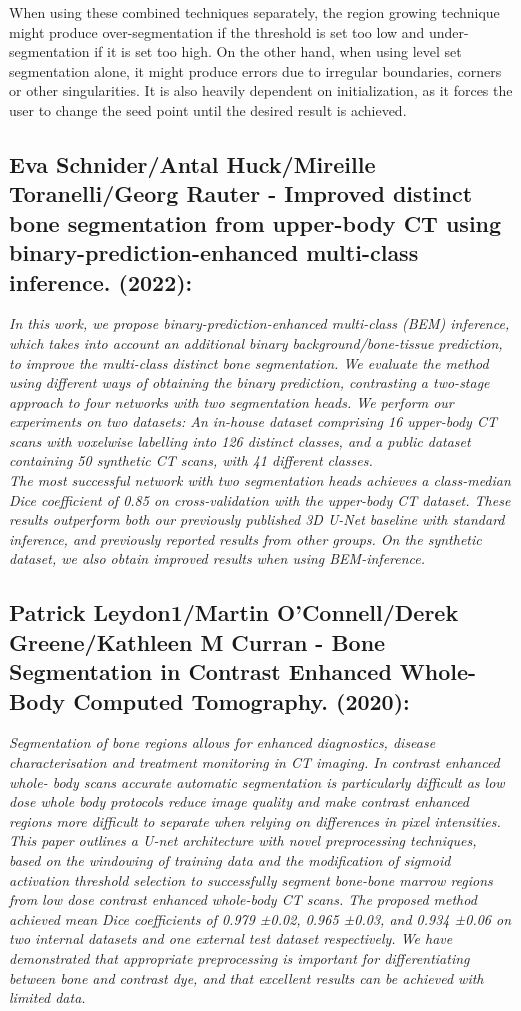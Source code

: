 \documentclass[conference]{IEEEtran}
\begin{document}
When using these combined techniques separately, the region growing technique might produce over-segmentation if the threshold is set too low and under-segmentation if it is set too high. On the other hand, when using level set segmentation alone, it might produce errors due to irregular boundaries, corners or other singularities. It is also heavily dependent on initialization, as it forces the user to change the seed point until the desired result is achieved.

\subsection{ \textbf{Eva Schnider/Antal Huck/Mireille Toranelli/Georg Rauter - Improved distinct bone segmentation from upper-body CT using binary-prediction-enhanced multi-class inference. (2022)}:}
\textit{In this work, we propose binary-prediction-enhanced multi-class (BEM) inference, which takes into account an additional binary background/bone-tissue prediction, to improve the multi-class distinct bone segmentation. We evaluate the method using different ways of obtaining the binary prediction, contrasting a two-stage approach to four networks with two segmentation heads. We perform our experiments on two datasets: An in-house dataset comprising 16 upper-body CT scans with voxelwise labelling into 126 distinct classes, and a public dataset containing 50 synthetic CT scans, with 41 different classes.
\\The most successful network with two segmentation heads achieves a class-median Dice coefficient of 0.85 on cross-validation with the upper-body CT dataset. These results outperform both our previously published 3D U-Net baseline with standard inference, and previously reported results from other groups. On the synthetic dataset, we also obtain improved results when using BEM-inference.}

\subsection{ \textbf{Patrick Leydon1/Martin O’Connell/Derek Greene/Kathleen M Curran - Bone Segmentation in Contrast Enhanced Whole-Body Computed Tomography. (2020)}:}
\textit{Segmentation of bone regions allows for enhanced diagnostics, disease
characterisation and treatment monitoring in CT imaging. In contrast enhanced whole-
body scans accurate automatic segmentation is particularly difficult as low dose whole
body protocols reduce image quality and make contrast enhanced regions more difficult
to separate when relying on differences in pixel intensities.
\\This paper outlines a U-net architecture with novel preprocessing techniques, based
on the windowing of training data and the modification of sigmoid activation threshold
selection to successfully segment bone-bone marrow regions from low dose contrast
enhanced whole-body CT scans. The proposed method achieved mean Dice coefficients
of 0.979 ±0.02, 0.965 ±0.03, and 0.934 ±0.06 on two internal datasets and one external
test dataset respectively. We have demonstrated that appropriate preprocessing is
important for differentiating between bone and contrast dye, and that excellent results
can be achieved with limited data.}
\end{document}
